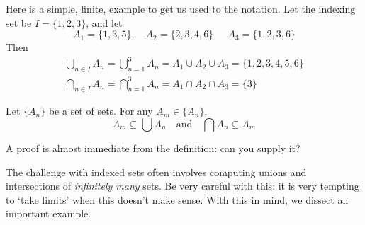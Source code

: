 \begin{example}{}{}
	Here is a simple, finite, example to get us used to the notation. Let the indexing set be $I=\{1,2,3\}$, and let
	\[
		A_1=\{1,3,5\},\quad A_2=\{2,3,4,6\},\quad A_3=\{1,2,3,6\}
	\]
	Then
	\begin{gather*}
		\bigcup_{n\in I}A_n =\bigcup_{n=1}^3A_n =A_1\cup A_2\cup A_3=\{1,2,3,4,5,6\} \\
		\bigcap_{n\in I}A_n =\bigcap_{n=1}^3A_n =A_1\cap A_2\cap A_3=\{3\}
	\end{gather*}
\end{example}


\begin{lemm}{}{}
	Let $\{A_n\}$ be a set of sets. For any $A_m\in \{A_n\}$,
	\[
		A_m\subseteq\bigcup A_n\quad\text{and}\quad \bigcap A_n\subseteq A_m
	\]
\end{lemm}

A proof is almost immediate from the definition: can you supply it?




The challenge with indexed sets often involves computing unions and intersections of \emph{infinitely many} sets. Be very careful with this: it is very tempting to `take limits' when this doesn't make sense. With this in mind, we dissect an important example.\par


